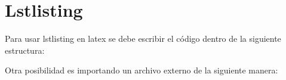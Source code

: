 \section{Lstlisting}

Para usar lstlisting en latex se debe escribir el c\'odigo dentro de la siguiente estructura:



Otra posibilidad es importando un archivo externo de la siguiente manera:
\begin{lstlisting}
  
\end{lstlisting}


